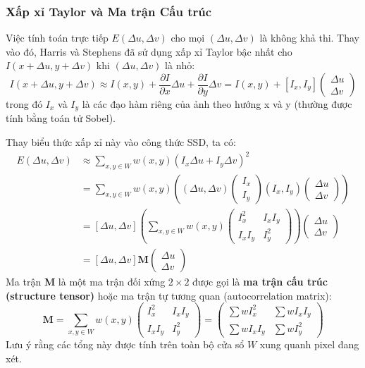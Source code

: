 \subsubsection{Xấp xỉ Taylor và Ma trận Cấu trúc}
\label{subsubsec:harris_taylor_approximation}
Việc tính toán trực tiếp $E(\Delta u, \Delta v)$ cho mọi $(\Delta u, \Delta v)$ là không khả thi. Thay vào đó, Harris và Stephens đã sử dụng xấp xỉ Taylor bậc nhất cho $I(x+\Delta u, y+\Delta v)$ khi $(\Delta u, \Delta v)$ là nhỏ:
\begin{equation}
    I(x+\Delta u, y+\Delta v) \approx I(x, y) + \frac{\partial I}{\partial x}\Delta u + \frac{\partial I}{\partial y}\Delta v = I(x, y) + [I_x, I_y] \begin{pmatrix} \Delta u \\ \Delta v \end{pmatrix}
\end{equation}
trong đó $I_x$ và $I_y$ là các đạo hàm riêng của ảnh theo hướng x và y (thường được tính bằng toán tử Sobel).

Thay biểu thức xấp xỉ này vào công thức SSD, ta có:
\begin{align}
    E(\Delta u, \Delta v) &\approx \sum_{x,y \in W} w(x, y) \left( I_x \Delta u + I_y \Delta v \right)^2 \\
    &= \sum_{x,y \in W} w(x, y) \left( (\Delta u, \Delta v) \begin{pmatrix} I_x \\ I_y \end{pmatrix} (I_x, I_y) \begin{pmatrix} \Delta u \\ \Delta v \end{pmatrix} \right) \\
    &= [\Delta u, \Delta v] \left( \sum_{x,y \in W} w(x, y) \begin{pmatrix} I_x^2 & I_x I_y \\ I_x I_y & I_y^2 \end{pmatrix} \right) \begin{pmatrix} \Delta u \\ \Delta v \end{pmatrix} \\
    &= [\Delta u, \Delta v] \mathbf{M} \begin{pmatrix} \Delta u \\ \Delta v \end{pmatrix}
\end{align}
Ma trận $\mathbf{M}$ là một ma trận đối xứng $2 \times 2$ được gọi là \textbf{ma trận cấu trúc (structure tensor)} hoặc ma trận tự tương quan (autocorrelation matrix):
\begin{equation}
    \mathbf{M} = \sum_{x,y \in W} w(x, y) \begin{pmatrix} I_x^2 & I_x I_y \\ I_x I_y & I_y^2 \end{pmatrix} = \begin{pmatrix} \sum wI_x^2 & \sum wI_x I_y \\ \sum wI_x I_y & \sum wI_y^2 \end{pmatrix}
    \label{eq:harris_matrix_m}
\end{equation}
Lưu ý rằng các tổng này được tính trên toàn bộ cửa sổ $W$ xung quanh pixel đang xét.

